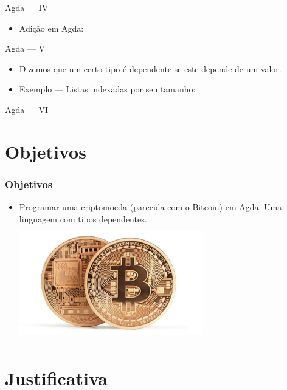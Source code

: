 \documentclass{beamer}
\begin{document}
       \begin{frame}{Agda --- IV}
         \begin{itemize}
           \item Adição em Agda:
         \end{itemize}
\end{frame}

       \begin{frame}{Agda --- V}
         \begin{itemize}
           \item Dizemos que um certo tipo é dependente se este depende de um valor.
           \item Exemplo --- Listas indexadas por seu tamanho:
         \end{itemize}
\end{frame}

       \begin{frame}{Agda --- VI}
	\begin{adjustwidth}{-3.5em}{-2em} \fontsize{8}{11}
	\end{adjustwidth}
\end{frame}
 
\section{Objetivos}

 \begin{frame}
\frametitle{Objetivos}
\begin{itemize}
    \item Programar uma criptomoeda (parecida com o Bitcoin) em Agda. Uma linguagem com tipos dependentes.
    \includegraphics[width=8cm, height=5cm]{TwoBitcoins}
\end{itemize}
\end{frame}

\section{Justificativa}
\end{document}
